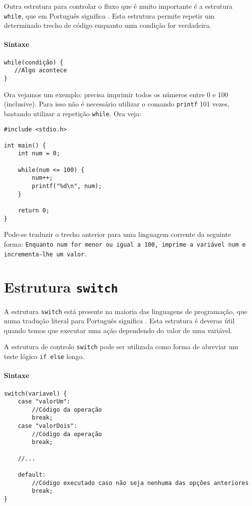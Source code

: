 Outra estrutura para controlar o fluxo que é muito importante é a estrutura \texttt{while}, que em Português significa . Esta estrutura permite repetir um determinado trecho de código enquanto uma condição for verdadeira.

\paragraph{Sintaxe}

\begin{lstlisting}
while(condição) {  
   //Algo acontece  
}  
\end{lstlisting}

Ora vejamos um exemplo: precisa imprimir todos os números entre 0 e 100 (inclusive). Para isso não é necessário utilizar o comando \texttt{printf} 101 vezes, bastando utilizar a repetição \texttt{while}. Ora veja:

\begin{lstlisting}
#include <stdio.h>  

int main() {     
    int num = 0;  
   
    while(num <= 100) { 
    	num++; 
        printf("%d\n", num);
    }  
   
    return 0;  
}
\end{lstlisting}

Pode-se traduzir o trecho anterior para uma linguagem corrente da seguinte forma: \texttt{Enquanto num for menor ou igual a 100, imprime a variável num e incrementa-lhe um valor}.

\section{Estrutura \texttt{switch}}

A estrutura \texttt{switch} está presente na maioria das linguagens de programação, que numa tradução literal para Português significa . Esta estrutura é deveras útil quando temos que executar uma ação dependendo do valor de uma variável.

A estrutura de controlo \texttt{switch} pode ser utilizada como forma de abreviar um teste lógico \texttt{if else} longo.

\paragraph{Sintaxe}

\begin{lstlisting}
switch(variavel) {
    case "valorUm":
        //Código da operação
        break;
    case "valorDois":
        //Código da operação
        break;

    //...	
	
    default:
        //Código executado caso não seja nenhuma das opções anteriores
        break;
}  
\end{lstlisting}

